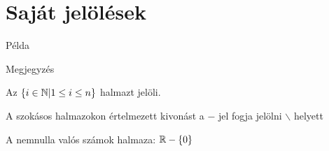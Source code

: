 \section{Saját jelölések}
\begin{pl}
	Példa
\end{pl}
\begin{megj}
	Megjegyzés
\end{megj}
\begin{jel}
	Az $\{i\in\mathbb{N}|1\leq i\leq n\}$ halmazt  jelöli.
\end{jel}
\begin{jel}
	A szokásos halmazokon értelmezett kivonást a $-$ jel fogja jelölni
	$\backslash$ helyett
\end{jel}
\begin{pl}
	A nemnulla valós számok halmaza: $\mathbb{R}-\{0\}$
\end{pl}

